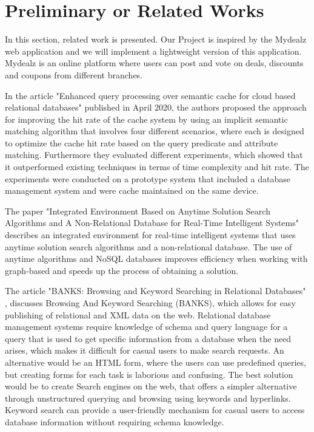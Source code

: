 \section{Preliminary or Related Works}
In this section, related work is presented. Our Project is inspired by the Mydealz web application \cite{Mydealz:2023} and we will implement a lightweight version of this application. Mydealz is an online platform where users can post and vote on deals, discounts and coupons from different branches.
\newline

In the article "Enhanced query processing over semantic cache for cloud based relational databases" \cite{Ahmad:2020} published in April 2020,  the authors proposed the approach for improving the hit rate of the cache system by using an implicit semantic matching algorithm that involves four different scenarios, where each is designed to optimize the cache hit rate based on the query predicate and attribute matching. Furthermore they evaluated different experiments, which showed that it outperformed existing techniques in terms of time complexity and hit rate. The experiments were conducted on a prototype system that included a database management system and were cache maintained on the same device.
\newline

The paper "Integrated Environment Based on Anytime Solution Search Algorithms and A Non-Relational Database for Real-Time Intelligent Systems" \cite{Eremeeva:2020} describes an integrated environment for real-time intelligent systems that uses anytime solution search algorithms and a non-relational database. The use of anytime algorithms and NoSQL databases improves efficiency when working with graph-based and speeds up the process of obtaining a solution.
\newline

The article "BANKS: Browsing and Keyword Searching in Relational Databases" \cite{Aditya:2007}, discusses Browsing And Keyword Searching (BANKS), which allows for easy publishing of relational and XML data on the web. Relational database management systems require knowledge of schema and query language for a query that is used to get specific information from a database when the need arises, which makes it difficult for casual users to make search requests. An alternative would be an HTML form, where the users can use predefined queries, but creating forms for each task is laborious and confusing. The best solution would be to create Search engines on the web, that offers a simpler alternative through unstructured querying and browsing using keywords and hyperlinks. Keyword search can provide a user-friendly mechanism for casual users to access database information without requiring schema knowledge.